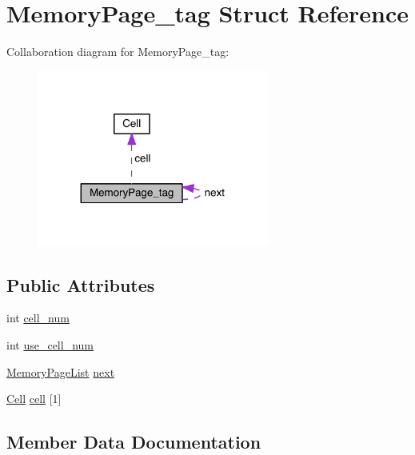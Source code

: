 \hypertarget{struct_memory_page__tag}{}\section{Memory\+Page\+\_\+tag Struct Reference}
\label{struct_memory_page__tag}


Collaboration diagram for Memory\+Page\+\_\+tag\+:\nopagebreak
\begin{figure}[H]
\begin{center}
\leavevmode
\includegraphics[width=215pt]{struct_memory_page__tag__coll__graph}
\end{center}
\end{figure}
\subsection*{Public Attributes}
\begin{DoxyCompactItemize}
\item 
int \hyperlink{struct_memory_page__tag_a683e8a1f905f2e4203bc9609c75e4e4c}{cell\+\_\+num}
\item 
int \hyperlink{struct_memory_page__tag_a21416c5c747f6617e9ecf641f086c614}{use\+\_\+cell\+\_\+num}
\item 
\hyperlink{storage_8c_af4620055f96a48dc7cf903128aa4e665}{Memory\+Page\+List} \hyperlink{struct_memory_page__tag_a53d3c92ac52441fba678eda169980229}{next}
\item 
\hyperlink{union_cell}{Cell} \hyperlink{struct_memory_page__tag_a7f1abbe528efa4a8fdea13cfc2757b8a}{cell} \mbox{[}1\mbox{]}
\end{DoxyCompactItemize}


\subsection{Member Data Documentation}
\hypertarget{struct_memory_page__tag_a7f1abbe528efa4a8fdea13cfc2757b8a}{}

